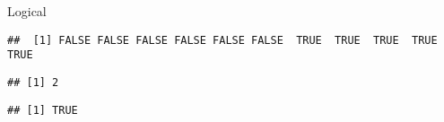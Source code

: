 \begin{frame}[fragile]{Logical}
\protect\hypertarget{logical}{}

\begin{Shaded}
\begin{Highlighting}[]
\StringTok{ }\NormalTok{(}\NormalTok{,}\NormalTok{)}
\OperatorTok{>}\StringTok{ }
\end{Highlighting}
\end{Shaded}

\begin{verbatim}
##  [1] FALSE FALSE FALSE FALSE FALSE FALSE  TRUE  TRUE  TRUE  TRUE  TRUE
\end{verbatim}

\begin{Shaded}
\begin{Highlighting}[]
\NormalTok{x[}\NormalTok{]}
\end{Highlighting}
\end{Shaded}

\begin{verbatim}
## [1] 2
\end{verbatim}

\begin{Shaded}
\begin{Highlighting}[]
\NormalTok{x[}\NormalTok{] }\OperatorTok{==}\StringTok{ }
\end{Highlighting}
\end{Shaded}

\begin{verbatim}
## [1] TRUE
\end{verbatim}

\end{frame}

